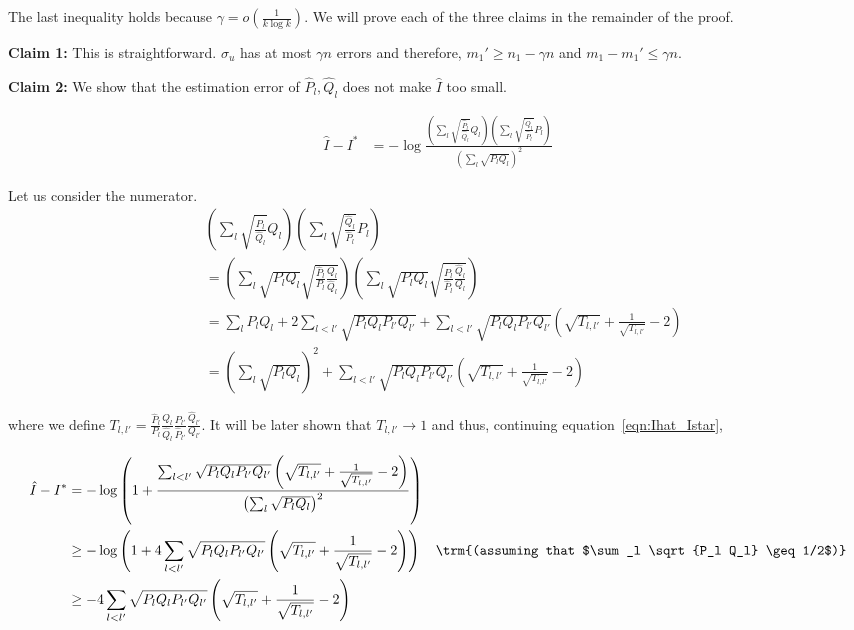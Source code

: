 \documentclass{article}
\begin{document}
The last inequality holds because $\gamma = o\left( \frac{1}{k \log k} \right)$. We will prove each of the three claims in the remainder of the proof.

\textbf{Claim 1:} This is straightforward. $\sigma_u$ has at most $\gamma n$ errors and therefore, $m_1' \geq n_1 - \gamma n$ and $m_1 - m_1' \leq \gamma n$. 

\textbf{Claim 2:} We show that the estimation error of $\hat{P}_l, \hat{Q}_l$ does not make $\hat{I}$ too small.

\begin{align}
\hat{I} - I^* &= - \log \frac{ 
     \left( \sum_l \sqrt{\frac{\hat{P}_l}{\hat{Q}_l}} Q_l \right)
     \left( \sum_l \sqrt{\frac{\hat{Q}_l}{\hat{P}_l}} P_l \right)}{ 
          \left( \sum_l \sqrt{P_l Q_l} \right)^2 } \label{eqn:Ihat_Istar}
\end{align}

Let us consider the numerator.
\begin{align*}
& \left( \sum_l \sqrt{ \frac{\hat{P}_l}{\hat{Q}_l}} Q_l \right)
\left( \sum_l \sqrt{ \frac{\hat{Q}_l}{\hat{P}_l}} P_l \right) \\
&= \left( \sum_l \sqrt{ P_l Q_l} \sqrt{ \frac{\hat{P}_l}{P_l} \frac{Q_l}{\hat{Q}_l}} \right) 
     \left( \sum_l \sqrt{P_l Q_l} \sqrt{ \frac{P_l}{\hat{P}_l} \frac{\hat{Q}_l}{ Q_l}} \right) \\
&= \sum_l P_l Q_l + 2\sum_{l < l'} \sqrt{P_l Q_l P_{l'} Q_{l'}} + 
   \sum_{l < l'} \sqrt{P_l Q_l P_{l'} Q_{l'}} \left( \sqrt{T_{l,l'}} + \frac{1}{\sqrt{T_{l,l'}}} - 2 \right) \\
&= \left( \sum_l \sqrt{P_l Q_l} \right)^2 + \sum_{l < l'} 
                  \sqrt{P_l Q_l P_{l'} Q_{l'}} \left( \sqrt{T_{l,l'}} + \frac{1}{\sqrt{T_{l,l'}}} - 2 \right) 
\end{align*}

where we define $T_{l,l'} = \frac{\hat{P}_l}{P_l} \frac{Q_l}{\hat{Q}_l} 
      \frac{P_{l'}}{\hat{P}_{l'}} \frac{\hat{Q}_{l'}}{Q_{l'}}  $. It will be later shown that $T_{l,l'} \rightarrow 1$ and thus, continuing equation~\ref{eqn:Ihat_Istar},

\begin{align}
\hat{I} - I^* &= - \log \left( 1 + \frac{ \sum_{l<l'} \sqrt{P_l Q_l P_{l'} Q_{l'}} 
    \left( \sqrt{T_{l,l'}} + \frac{1}{\sqrt{T_{l,l'}}} - 2 \right)}
    { \left( \sum_l \sqrt{ P_l Q_l} \right)^2 }  \right) \nonumber \\
     &  \geq  - \log \left( 1 + 4 \sum_{l<l'} \sqrt{P_l Q_l P_{l'} Q_{l'}}  
    \left( \sqrt{T_{l,l'}} + \frac{1}{\sqrt{T_{l,l'}}} - 2 \right)  \right) 
  \quad \trm{(assuming that $\sum_l \sqrt{P_l Q_l} \geq 1/2$)} \nonumber \\
   & \geq - 4 \sum_{l < l'} \sqrt{P_l Q_l P_{l'} Q_{l'}} 
    \left( \sqrt{T_{l,l'}} + \frac{1}{\sqrt{T_{l,l'}}} - 2 \right) \label{eqn:Ihat_Istar2}
\end{align}
\end{document}
